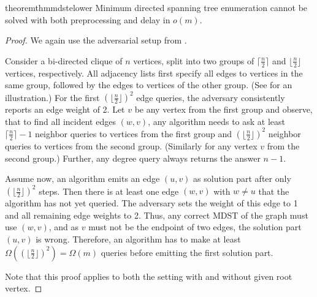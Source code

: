 \documentclass[a4paper, USenglish, cleveref, autoref, thm-restate]{lipics-v2021}
\begin{document}
\begin{restatable}{theorem}{thmmdstelower}
	\label{thm:mdste-lower}
	Minimum directed spanning tree enumeration cannot be solved with both preprocessing and delay in $o(m)$.
\end{restatable}
\begin{proof}
	We again use the adversarial setup from .
	
	Consider a bi-directed clique of $n$ vertices, split into two groups of $\lceil \frac{n}{2} \rceil$ and $\lfloor \frac{n}{2} \rfloor$ vertices, respectively.
	All adjacency lists first specify all edges to vertices in the same group, followed by the edges to vertices of the other group.
	(See  for an illustration.)
	For the first $(\lfloor \frac{n}{2} \rfloor)^2$ edge queries, the adversary consistently reports an edge weight of 2.
	Let $v$ be any vertex from the first group and observe, that to find all incident edges $(w,v)$, any algorithm needs to ask at least $\lceil \frac{n}{2} \rceil-1$ neighbor queries to vertices from the first group and $(\lfloor \frac{n}{2} \rfloor)^2$ neighbor queries to vertices from the second group.
	(Similarly for any vertex $v$ from the second group.)
	Further, any degree query always returns the answer $n-1$.
	
	Assume now, an algorithm  emits  an edge $(u,v)$ as solution part after only $(\lfloor \frac{n}{2} \rfloor)^2$ steps.
	Then there is at least one edge $(w,v)$ with $w \neq u$ that the algorithm has not yet queried.
	The adversary sets the weight of this edge to 1 and all remaining edge weights to 2.
	Thus, any correct MDST of the graph must use $(w,v)$, and as $v$ must not be the endpoint of two edges, the solution part $(u,v)$ is wrong.
	Therefore, an algorithm has to make at least $\Omega((\lfloor \frac{n}{2} \rfloor)^2) = \Omega(m)$ queries before emitting the first solution part.
	
	Note that this proof applies to both the setting with and without given root vertex.
\end{proof}
\end{document}
